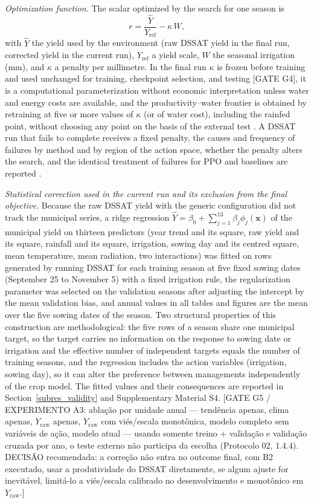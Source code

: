 \documentclass[times,final,authoryear]{elsarticle}
\begin{document}
\emph{Optimization function.} The scalar optimized by the search for one season is
\begin{equation}
r = \frac{\hat{Y}}{Y_{\text{ref}}} - \kappa\, W,
\label{eq_reward}
\end{equation}
with $\hat{Y}$ the yield used by the environment (raw DSSAT yield in the final run, corrected yield in the current run), $Y_{\text{ref}}$ a yield scale, $W$ the seasonal irrigation (mm), and $\kappa$ a penalty per millimetre.  In the final run $\kappa$ is frozen before training and used unchanged for training, checkpoint selection, and testing [GATE G4], it is a computational parameterization without economic interpretation unless water and energy costs are available, and the productivity--water frontier is obtained by retraining at five or more values of $\kappa$ (or of water cost), including the rainfed point, without choosing any point on the basis of the external test . A DSSAT run that fails to complete receives a fixed penalty, the causes and frequency of failures by method and by region of the action space, whether the penalty alters the search, and the identical treatment of failures for PPO and baselines are reported .

\emph{Statistical correction used in the current run and its exclusion from the final objective.} Because the raw DSSAT yield with the generic configuration did not track the municipal series, a ridge regression $\hat{Y} = \beta_0 + \sum_{j=1}^{13} \beta_j \phi_j(\mathbf{x})$ of the municipal yield on thirteen predictors (year trend and its square, raw yield and its square, rainfall and its square, irrigation, sowing day and its centred square, mean temperature, mean radiation, two interactions) was fitted on rows generated by running DSSAT for each training season at five fixed sowing dates (September 25 to November 5) with a fixed irrigation rule, the regularization parameter was selected on the validation seasons after adjusting the intercept by the mean validation bias, and annual values in all tables and figures are the mean over the five sowing dates of the season. Two structural properties of this construction are methodological: the five rows of a season share one municipal target, so the target carries no information on the response to sowing date or irrigation and the effective number of independent targets equals the number of training seasons, and the regression includes the action variables (irrigation, sowing day), so it can alter the preference between managements independently of the crop model. The fitted values and their consequences are reported in Section~\ref{subres_validity} and Supplementary Material S4. [GATE G5 / EXPERIMENTO A3: ablação por unidade anual --- tendência apenas, clima apenas, $Y_{\text{raw}}$ apenas, $Y_{\text{raw}}$ com viés/escala monotônica, modelo completo sem variáveis de ação, modelo atual --- usando somente treino + validação e validação cruzada por ano, o teste externo não participa da escolha (Protocolo 02, 1.4.4). DECISÃO recomendada: a correção não entra no outcome final, com B2 executado, usar a produtividade do DSSAT diretamente, se algum ajuste for inevitável, limitá-lo a viés/escala calibrado no desenvolvimento e monotônico em $Y_{\text{raw}}$.]
\end{document}
